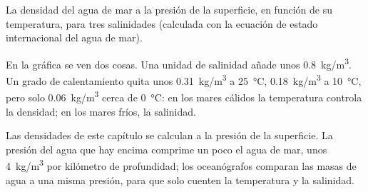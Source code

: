 \begin{omfigure}

{\small La densidad del agua de mar a la presión de la superficie, en función
de su temperatura, para tres salinidades (calculada con la ecuación de estado
internacional del agua de mar).}
\end{omfigure}

En la gráfica se ven dos cosas. Una unidad de salinidad añade unos
\qty{0.8}{kg/m^3}. Un grado de calentamiento quita unos \qty{0.31}{kg/m^3}
a \qty{25}{\degreeCelsius}, \qty{0.18}{kg/m^3} a \qty{10}{\degreeCelsius},
pero solo \qty{0.06}{kg/m^3} cerca de \qty{0}{\degreeCelsius}: en los mares
cálidos la temperatura controla la densidad; en los mares fríos, la salinidad.

\begin{remark}
Las densidades de este capítulo se calculan a la presión de la superficie.
La presión del agua que hay encima comprime un poco el agua de mar, unos
\qty{4}{kg/m^3} por kilómetro de profundidad; los oceanógrafos comparan las
masas de agua a una misma presión, para que solo cuenten la temperatura y la
salinidad.
\end{remark}

